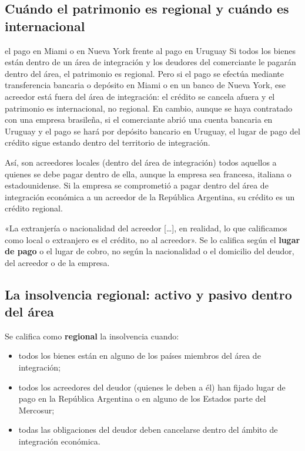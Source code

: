 \documentclass[12pt,oneside]{book}
\begin{document}
\subsection{Cuándo el patrimonio es regional y cuándo es internacional}

\begin{example}{el pago en Miami o en Nueva York frente al pago en Uruguay}
Si todos los bienes están dentro de un área de integración y los deudores del comerciante le pagarán dentro del área, el patrimonio es regional. Pero si el pago se efectúa mediante transferencia bancaria o depósito en Miami o en un banco de Nueva York, ese acreedor está fuera del área de integración: el crédito se cancela afuera y el patrimonio es internacional, no regional. En cambio, aunque se haya contratado con una empresa brasileña, si el comerciante abrió una cuenta bancaria en Uruguay y el pago se hará por depósito bancario en Uruguay, el lugar de pago del crédito sigue estando dentro del territorio de integración.
\end{example}

Así, son acreedores locales (dentro del área de integración) todos aquellos a quienes se debe pagar dentro de ella, aunque la empresa sea francesa, italiana o estadounidense. Si la empresa se comprometió a pagar dentro del área de integración económica a un acreedor de la República Argentina, su crédito es un crédito regional.

\begin{important}
«La extranjería o nacionalidad del acreedor [\ldots], en realidad, lo que calificamos como local o extranjero es el crédito, no al acreedor». Se lo califica según el \textbf{lugar de pago} o el lugar de cobro, no según la nacionalidad o el domicilio del deudor, del acreedor o de la empresa.
\end{important}

\subsection{La insolvencia regional: activo y pasivo dentro del área}

Se califica como \textbf{regional} la insolvencia cuando:

\begin{itemize}
    \item todos los bienes están en alguno de los países miembros del área de integración;
    \item todos los acreedores del deudor (quienes le deben a él) han fijado lugar de pago en la República Argentina o en alguno de los Estados parte del Mercosur;
    \item todas las obligaciones del deudor deben cancelarse dentro del ámbito de integración económica.
\end{itemize}
\end{document}
